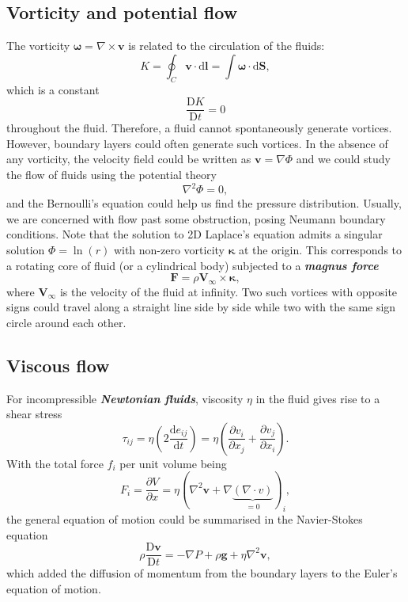 \documentclass{article}
\begin{document}
\subsection{Vorticity and potential flow}
The vorticity $\boldsymbol{\mathbf{\omega}} = \nabla \times \mathbf{v}$ is related to the circulation of the fluids: 
\[
    K = \oint_C \mathbf{v} \cdot \mathrm{d} \mathbf{l}  = 
    \int \mathbf{\omega} \cdot \mathrm{d} \mathbf{S}, 
\]
which is a constant 
\[
    \frac{\mathrm{D}K}{\mathrm{D}t} = 0
\]
throughout the fluid. Therefore, a fluid cannot spontaneously generate vortices. However, boundary layers could often generate such vortices. In the absence of any vorticity, the velocity field could be written as \(\mathbf{v}  = \nabla \Phi \) and we could study the flow of fluids using the potential theory 
\[
    \nabla ^{2} \Phi  = 0,
\]
and the Bernoulli's equation could help us find the pressure distribution. Usually, we are concerned with flow past some obstruction, posing Neumann boundary conditions. Note that the solution to 2D Laplace's equation admits a singular solution $\Phi = \ln(r)$ with non-zero vorticity $\boldsymbol{\mathbf{\kappa}} $ at the origin. This corresponds to a rotating core of fluid (or a cylindrical body) subjected to a \textit{\textbf{magnus force}}
\[
    \mathbf{F}  = \rho  \mathbf{V_{\infty }} \times \boldsymbol{\mathbf{\kappa}}   , 
\] 
where $\mathbf{V_\infty } $ is the velocity of the fluid at infinity. Two such vortices with opposite signs could travel along a straight line side by side while two with the same sign circle around each other. 

\subsection{Viscous flow}
For incompressible \textit{\textbf{Newtonian fluids}}, viscosity $\eta $ in the fluid gives rise to a shear stress
\[
    \boxed{
    \tau_{ij} = \eta \left( 2 \frac{\mathrm{d}e_{ij}}{\mathrm{d}t} \right)
    = \eta \left(\frac{\partial v_i}{\partial x_j} + \frac{\partial v_j}{\partial x_i} \right).} 
\]
With the total force $f_i$ per unit volume being 
\[
    F_i = \frac{\partial V}{\partial x} = \eta \left(\nabla ^{2} \mathbf{v} + \nabla \underbrace{(\nabla \cdot v)}_{=0}\right)_i,
\]
the general equation of motion could be summarised in the Navier-Stokes equation
\[
    \boxed{\rho \frac{\mathrm{D}\mathbf{v} }{\mathrm{D}t}  = -\nabla P + \rho \mathbf{g} + \eta \nabla^{2} \mathbf{v},}
\]
which added the diffusion of momentum from the boundary layers to the Euler's equation of motion. 
\end{document}
